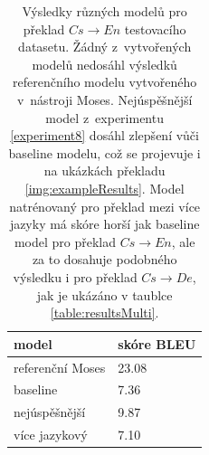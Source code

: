\begin{table}[H]
    \begin{center}
        \begin{tabular}{ll}
          \toprule
           model & skóre BLEU \\
          \midrule
           referenční Moses & 23.08 \\
           baseline & 7.36 \\
           nejúspěšnější & 9.87 \\
           více jazykový & 7.10 \\
          \bottomrule
        \end{tabular}
    \end{center}
	\caption{Výsledky různých modelů pro překlad $Cs\rightarrow En$ testovacího datasetu. Žádný z~vytvořených modelů nedosáhl výsledků referenčního modelu vytvořeného v~nástroji Moses. Nejúspěšnější model z~experimentu \ref{experiment8} dosáhl zlepšení vůči baseline modelu, což se projevuje i na ukázkách překladu \ref{img:exampleResults}. Model natrénovaný pro překlad mezi více jazyky má skóre horší jak baseline model pro překlad $Cs\rightarrow En$, ale za to dosahuje podobného výsledku i pro překlad $Cs\rightarrow De$, jak je ukázáno v taublce \ref{table:resultsMulti}.}
	\label{table:results}
\end{table}


